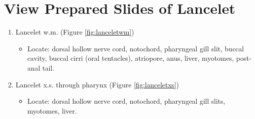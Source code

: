 \documentclass[]{book}
\providecommand{\tightlist}{%
  \setlength{\itemsep}{0pt}\setlength{\parskip}{0pt}}
\theoremstyle{definition}
\theoremstyle{definition}
\theoremstyle{definition}
\theoremstyle{remark}
\begin{document}
\section{View Prepared Slides of
Lancelet}\label{view-prepared-slides-of-lancelet}

\begin{enumerate}
\def\labelenumi{\arabic{enumi}.}
\tightlist
\item
  Lancelet w.m. (Figure \ref{fig:lanceletwm})

  \begin{itemize}
  \tightlist
  \item
    Locate: dorsal hollow nerve cord, notochord, pharyngeal gill slit,
    buccal cavity, buccal cirri (oral tentacles), atriopore, anus,
    liver, myotomes, post-anal tail.
  \end{itemize}
\item
  Lancelet x.s. through pharynx (Figure \ref{fig:lanceletxs})

  \begin{itemize}
  \tightlist
  \item
    Locate: dorsal hollow nerve cord, notochord, pharyngeal gill slits,
    myotomes, liver.
  \end{itemize}
\end{enumerate}
\end{document}

